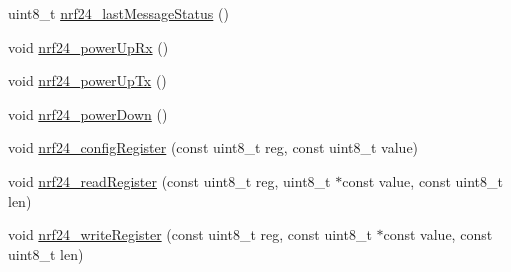 \begin{DoxyCompactItemize}
uint8\-\_\-t \hyperlink{a00012_a887f428c44dc2efda8a9f701dee6ec34}{nrf24\-\_\-last\-Message\-Status} ()
\item 
void \hyperlink{a00012_a5e2122f30566907a73d39598ba99ef08}{nrf24\-\_\-power\-Up\-Rx} ()
\item 
void \hyperlink{a00012_a8aa77fbedb60ef1265f451dc400d1489}{nrf24\-\_\-power\-Up\-Tx} ()
\item 
void \hyperlink{a00012_ac7b63ad34704615c539accfd00a12ed5}{nrf24\-\_\-power\-Down} ()
\item 
void \hyperlink{a00012_ace5bf3cbfb7f6c45231d9eab7dfe0373}{nrf24\-\_\-config\-Register} (const uint8\-\_\-t reg, const uint8\-\_\-t value)
\item 
void \hyperlink{a00012_aba4b294e59aceefdab9272e82b9ce7ce}{nrf24\-\_\-read\-Register} (const uint8\-\_\-t reg, uint8\-\_\-t $\ast$const value, const uint8\-\_\-t len)
\item 
void \hyperlink{a00012_a481ba63c1bd3abdabb6e3211c8b68f9f}{nrf24\-\_\-write\-Register} (const uint8\-\_\-t reg, const uint8\-\_\-t $\ast$const value, const uint8\-\_\-t len)
\end{DoxyCompactItemize}


